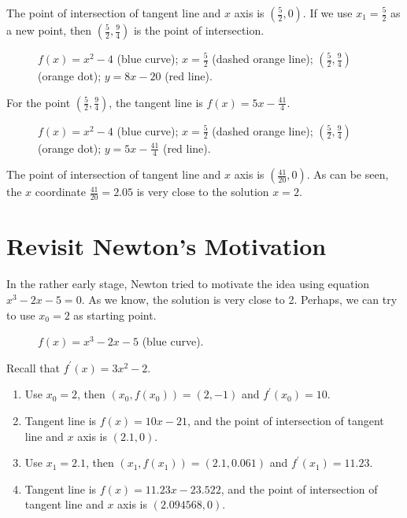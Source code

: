 \documentclass[12pt]{article}
\begin{document}
The point of intersection of tangent line and $x$ axis is $(\frac{5}{2},0)$. If we use $x_1=\frac{5}{2}$ as a new point, then $(\frac{5}{2},\frac{9}{4})$ is the point of intersection.

\begin{figure}[h]
    \centering
    
    \caption{{\color{blue}$f(x)=x^2-4$} (blue curve); {\color{orange}$x=\frac{5}{2}$} (dashed orange line); {\color{orange}$(\frac{5}{2},\frac{9}{4})$} (orange dot); {\color{red}$y=8x-20$} (red line).}
    \label{example1_s4}
\end{figure}

For the point $(\frac{5}{2},\frac{9}{4})$, the tangent line is $f(x)=5x-\frac{41}{4}$.

\begin{figure}[h]
    \centering
    
    \caption{{\color{blue}$f(x)=x^2-4$} (blue curve); {\color{orange}$x=\frac{5}{2}$} (dashed orange line); {\color{orange}$(\frac{5}{2},\frac{9}{4})$} (orange dot); {\color{red}$y=5x-\frac{41}{4}$} (red line).}
    \label{example1_s5}
\end{figure}

The point of intersection of tangent line and $x$ axis is $(\frac{41}{20},0)$. As can be seen, the $x$ coordinate $\frac{41}{20}=2.05$ is very close to the solution $x=2$.

\clearpage

\section{Revisit Newton's Motivation}

In the rather early stage, Newton tried to motivate the idea using equation $x^3-2x-5=0$. As we know, the solution is very close to 2. Perhaps, we can try to use $x_0=2$ as starting point.

\begin{figure}[h]
    \centering
    
    \caption{{\color{blue}$f(x)=x^3-2x-5$} (blue curve).}
    \label{example2_s1}
\end{figure}

Recall that $f^\prime(x)=3x^2-2$.
\begin{enumerate}
\item Use $x_0=2$, then $(x_0,f(x_0))=(2,-1)$ and $f^\prime(x_0)=10$.
\item Tangent line is $f(x)=10x-21$, and the point of intersection of tangent line and $x$ axis is $(2.1,0)$.
\item Use $x_1=2.1$, then $(x_1,f(x_1))=(2.1,0.061)$ and $f^\prime(x_1)=11.23$.
\item Tangent line is $f(x)=11.23x-23.522$, and the point of intersection of tangent line and $x$ axis is $(2.094568,0)$.
\end{enumerate}
\end{document}
